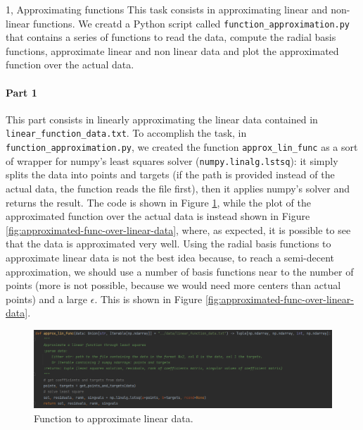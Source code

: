 \documentclass[10pt,a4paper]{article}
\begin{document}
\frontpage

\begin{task}{1, Approximating functions}
This task consists in approximating linear and non-linear functions.
We creatd a Python script called \texttt{function\_approximation.py} that contains a series of functions to read the data, compute the radial basis functions, approximate linear and non linear data and plot the approximated function over the actual data.

\paragraph{Part 1}
This part consists in linearly approximating the linear data contained in \texttt{linear\_function\_data.txt}.
To accomplish the task, in \texttt{function\_approximation.py}, we created the function \texttt{approx\_lin\_func} as a sort of wrapper for numpy's least squares solver (\texttt{numpy.linalg.lstsq}): it simply splits the data into points and targets (if the path is provided instead of the actual data, the function reads the file first), then it applies numpy's solver and returns the result.
The code is shown in Figure \ref{fig:approx-lin-func}, while the plot of the approximated function over the actual data is instead shown in Figure \ref{fig:approximated-func-over-linear-data}, where, as expected, it is possible to see that the data is approximated very well.
Using the radial basis functions to approximate linear data is not the best idea because, to reach a semi-decent approximation, we should use a number of basis functions near to the number of points (more is not possible, because we would need more centers than actual points) and a large $\epsilon$.
This is shown in Figure \ref{fig:approximated-func-over-linear-data}.

\begin{figure}[H]
    \centering
    \includegraphics[width=1.0\textwidth]{images/approx_lin_func.png}
    \caption{Function to approximate linear data.}
    \label{fig:approx-lin-func}
\end{figure}


\end{task}
\end{document}
